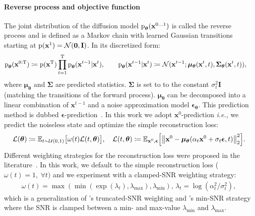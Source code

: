 \documentclass[twoside,11pt]{fairmeta}
\newcommand{\diffx}[2]{\rvx^{#1}_{#2}}
\newcommand{\ptheta}{\rp_\rvtheta}
\newcommand{\defeq}{\coloneqq}
\newcommand{\ie}{\textit{i.e.,}\xspace}
\newcommand{\loss}{\mathcal{L}}
\def\rp{{\textnormal{p}}}
\def\rT{{\textnormal{T}}}
\def\rvepsilon{{\bm{\epsilon}}}
\def\rvtheta{{\bm{\theta}}}
\def\rvmu{{\bm{\mu}}}
\def\rvx{{\mathbf{x}}}
\def\rvzero{{\mathbf{0}}}
\def\rmI{{\mathbf{I}}}
\def\rmSigma{{\mathbf{\Sigma}}}
\begin{document}
\paragraph{Reverse process and objective function}
The joint distribution of the diffusion model $\ptheta(\diffx{0\ldots 1}{})$ is called the reverse process and is defined as a Markov chain with learned Gaussian transitions starting at $\rp(\diffx{1}{})=\mathcal N(\rvzero, \rmI)$. In its discretized form:
\begin{align}
    \ptheta(\diffx{0:\rT}{}) &\defeq \rp(\diffx{\rT}{})\prod_{t=1}^\rT \ptheta(\diffx{t-1}{}|\diffx{t}{}), \qquad
    \ptheta(\diffx{t-1}{}|\diffx{t}{}) \defeq \mathcal N(\diffx{t-1}{}; \rvmu_\rvtheta(\diffx{t}{}, t), \rmSigma_\rvtheta(\diffx{t}{}, t)),
\end{align}
where $\rvmu_\rvtheta$ and $\rmSigma$ are predicted statistics. $\rmSigma$ is set to to the constant $\sigma_t^2\rmI$ (matching the transitions of the forward process).
$\rvmu_\rvtheta$ can be decomposed into a linear combination of $\diffx{t-1}{}$ and a noise approximation model $\rvepsilon_\rvtheta$. This prediction method is dubbed $\rvepsilon$-prediction~\citep{DDPM,nichol2021improved,glide}. In this work we adopt $\diffx{0}{}$-prediction \ie we predict the noiseless state and optimize the simple reconstruction loss:
\begin{align}
    \loss(\rvtheta) \defeq \mathbb E_{t\sim\mathcal U(0,1)} \big[\omega(t) \loss(t, \rvtheta)\big],\quad
    \loss(t, \rvtheta) \defeq \mathbb E_{\diffx{0}{}, \rvepsilon} \Bigl[\big\| \diffx{0}{} - \rvmu_\rvtheta(\alpha_t\diffx{0}{} + \sigma_t\rvepsilon, t) \big\|_2^2\Bigr].
\end{align}
Different weighting strategies for the reconstruction loss were proposed in the literature~\citep{DDPM,maxsnr,minsnr}. In this work, we default to the simple reconstruction loss ($\omega(t)=1,\;\forall t)$ and we experiment with a clamped-SNR weighting strategy:
\begin{align}
    \omega(t) = \max(\min(\exp(\lambda_t), \lambda_{\max}), \lambda_{\min}), \, \lambda_t = \log(\alpha_t^2/\sigma_t^2),
\end{align}
which is a generalization of \citet{maxsnr}'s truncated-SNR weighting and \citet{minsnr}'s min-SNR strategy where the SNR is clamped between a min- and max-value $\lambda_{\min}$ and $\lambda_{\max}$.
\end{document}
